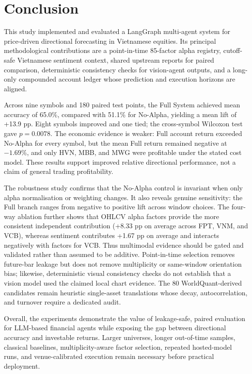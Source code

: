 \section{Conclusion}
\label{sec:conclusion}

This study implemented and evaluated a LangGraph multi-agent system for price-driven directional forecasting in Vietnamese equities. Its principal methodological contributions are a point-in-time 85-factor alpha registry, cutoff-safe Vietnamese sentiment context, shared upstream reports for paired comparison, deterministic consistency checks for vision-agent outputs, and a long-only compounded account ledger whose prediction and execution horizons are aligned.

Across nine symbols and 180 paired test points, the Full System achieved mean accuracy of 65.0\%, compared with 51.1\% for No-Alpha, yielding a mean lift of +13.9 pp. Eight symbols improved and one tied; the cross-symbol Wilcoxon test gave $p=0.0078$. The economic evidence is weaker: Full account return exceeded No-Alpha for every symbol, but the mean Full return remained negative at $-1.69\%$, and only HVN, MBB, and MWG were profitable under the stated cost model. These results support improved relative directional performance, not a claim of general trading profitability.

The robustness study confirms that the No-Alpha control is invariant when only alpha normalisation or weighting changes. It also reveals genuine sensitivity: the Full branch ranges from negative to positive lift across window choices. The four-way ablation further shows that OHLCV alpha factors provide the more consistent independent contribution (+8.33 pp on average across FPT, VNM, and VCB), whereas sentiment contributes +1.67 pp on average and interacts negatively with factors for VCB. Thus multimodal evidence should be gated and validated rather than assumed to be additive. Point-in-time selection removes future-bar leakage but does not remove multiplicity or same-window orientation bias; likewise, deterministic visual consistency checks do not establish that a vision model used the claimed local chart evidence. The 80 WorldQuant-derived candidates remain heuristic single-asset translations whose decay, autocorrelation, and turnover require a dedicated audit.

Overall, the experiments demonstrate the value of leakage-safe, paired evaluation for LLM-based financial agents while exposing the gap between directional accuracy and investable returns. Larger universes, longer out-of-time samples, classical baselines, multiplicity-aware factor selection, repeated hosted-model runs, and venue-calibrated execution remain necessary before practical deployment.
